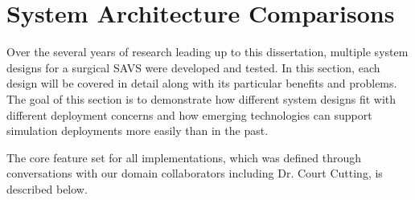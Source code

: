 \section{System Architecture Comparisons}

Over the several years of research leading up to this dissertation,
multiple system designs for a surgical SAVS were developed and
tested. In this section, each design will be covered in detail along
with its particular benefits and problems. The goal of this section is
to demonstrate how different system designs fit with different
deployment concerns and how emerging technologies can support
simulation deployments more easily than in the past.

The core feature set for all implementations, which was defined
through conversations with our domain collaborators including
Dr. Court Cutting, is described below.

